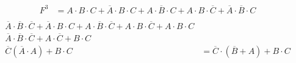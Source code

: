 \documentclass{article}
\begin{document}
\begin{align*}
    F^3 &= A \cdot B \cdot C + \overline{A} \cdot B \cdot C + A \cdot \overline{B} \cdot C + A \cdot B \cdot \overline{C} + \overline{A} \cdot \overline{B} \cdot C \\
\end{align*}
\begin{align*}
    \overline{A} \cdot \overline{B} \cdot \overline{C} + \overline{A} \cdot B \cdot C + A \cdot \overline{B} \cdot \overline{C} + A \cdot B \cdot \overline{C} + A \cdot B \cdot C \\
    \overline{A} \cdot \overline{B} \cdot \overline{C} + A \cdot \overline{C} + B \cdot C \\
    \overline{C} (\overline{A} \cdot A) + B \cdot C &=
    \overline{C} \cdot (\overline{B} + A) + B \cdot C \\
\end{align*}
\end{document}
